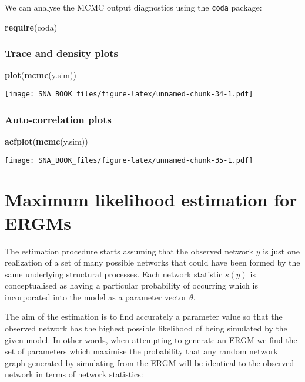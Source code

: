 \documentclass[]{book}
\newenvironment{Shaded}{\begin{snugshade}}{\end{snugshade}}
\newcommand{\KeywordTok}[1]{\textcolor[rgb]{0.13,0.29,0.53}{\textbf{{#1}}}}
\newcommand{\NormalTok}[1]{{#1}}
\begin{document}
We can analyse the MCMC output diagnostics using the \texttt{coda}
package:

\begin{Shaded}
\begin{Highlighting}[]
\KeywordTok{require}\NormalTok{(coda)}
\end{Highlighting}
\end{Shaded}

\subsection{Trace and density plots}\label{trace-and-density-plots}

\begin{Shaded}
\begin{Highlighting}[]
\KeywordTok{plot}\NormalTok{(}\KeywordTok{mcmc}\NormalTok{(y.sim))}
\end{Highlighting}
\end{Shaded}

\texttt{[image: SNA\_BOOK\_files/figure-latex/unnamed-chunk-34-1.pdf]}

\subsection{Auto-correlation plots}\label{auto-correlation-plots}

\begin{Shaded}
\begin{Highlighting}[]
\KeywordTok{acfplot}\NormalTok{(}\KeywordTok{mcmc}\NormalTok{(y.sim))}
\end{Highlighting}
\end{Shaded}

\texttt{[image: SNA\_BOOK\_files/figure-latex/unnamed-chunk-35-1.pdf]}

\chapter{Maximum likelihood estimation for ERGMs}\label{MLE_ERGMs}

The estimation procedure starts assuming that the observed network \(y\)
is just one realization of a set of many possible networks that could
have been formed by the same underlying structural processes. Each
network statistic \(s(y)\) is conceptualised as having a particular
probability of occurring which is incorporated into the model as a
parameter vector \(\theta\).

The aim of the estimation is to find accurately a parameter value so
that the observed network has the highest possible likelihood of being
simulated by the given model. In other words, when attempting to
generate an ERGM we find the set of parameters which maximise the
probability that any random network graph generated by simulating from
the ERGM will be identical to the observed network in terms of network
statistics:
\end{document}
